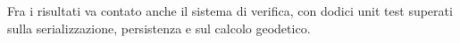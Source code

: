 %

Fra i risultati va contato anche il sistema di verifica, con dodici unit test superati sulla serializzazione,
persistenza e sul calcolo geodetico.

